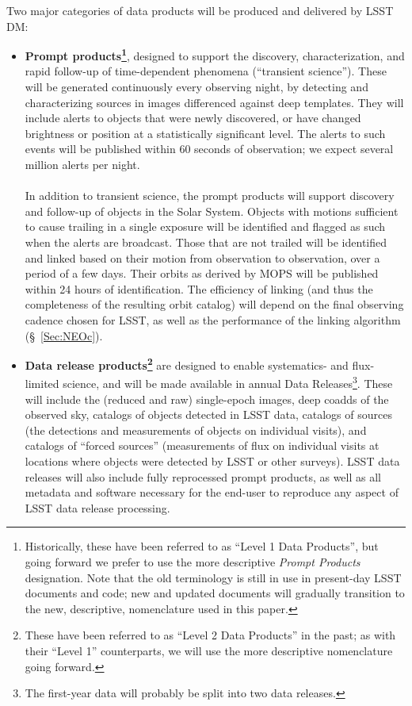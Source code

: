 Two major categories of data products will be produced and delivered by LSST DM:
\begin{itemize}
\item \textbf{  Prompt products\footnote{Historically, these have been referred to as ``Level
1 Data Products'', but going forward we prefer to use the more descriptive
\emph{Prompt Products} designation. Note that the old terminology is still
in use in present-day LSST documents and code; new and updated
documents will gradually transition to the new, descriptive, nomenclature
used in this paper.
}}, designed to support the discovery,
  characterization, and rapid follow-up of time-dependent phenomena
  (``transient science''). These will be generated continuously every
  observing night, by detecting and characterizing sources in images
  differenced against deep templates. They will include alerts to
  objects that were newly discovered, or have changed brightness or
  position at a statistically significant level. The alerts to such
  events will be published within 60   seconds of observation; we
  expect several million alerts per night.\\
\\
In addition to transient science, the prompt products will support
discovery and follow-up of objects in the Solar System. Objects with
motions sufficient to cause trailing in a single exposure will be
identified and flagged as such when the alerts are broadcast. Those
that are not trailed will be identified and linked based on their
motion from observation to observation, over a period of a few
days. Their orbits as derived by MOPS will be published within 24 hours of
identification. The efficiency of linking (and thus the completeness
of the resulting orbit catalog) will depend on the final observing
cadence chosen for LSST, as well as the performance of the linking
algorithm (\S~\ref{Sec:NEOc}).
\item \textbf{Data release products\footnote{These have been referred to as ``Level
2 Data Products'' in the past; as with their ``Level 1'' counterparts, we
will use the more descriptive nomenclature going forward.}} are
  designed to enable systematics- and flux-limited science, and will
  be made available in annual Data Releases\footnote{The first-year
    data will probably be split into two data releases.}. These will include the (reduced and raw) single-epoch images, deep coadds of the observed sky, catalogs of objects detected in LSST data, catalogs of sources (the detections and measurements of objects on individual visits), and catalogs of ``forced sources'' (measurements of flux on individual visits at locations where objects were detected by LSST or other surveys). LSST data releases will also include fully reprocessed prompt products, as well as all metadata and software necessary for the end-user to reproduce any aspect of LSST data release processing.\\

\end{itemize}
